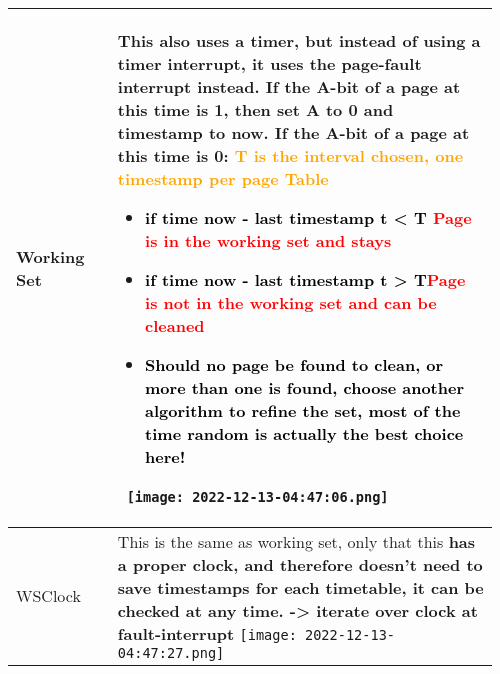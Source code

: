 \documentclass[main.tex,fontsize=8pt,paper=a4,paper=portrait,DIV=calc,]{scrartcl}
\begin{document}
\begin{table}[ht!]
\begin{tabular}{|m{0.2\linewidth}|m{0.755\linewidth}|}
\hline
Working Set & 
This also uses a timer, but \textbf{instead of using a timer interrupt, it uses the page-fault interrupt instead}.\newline
If the A-bit of a page at this time is 1, then set A to 0 and timestamp to now.\newline
If the A-bit of a page at this time is 0:\newline
\textcolor{orange}{T is the interval chosen, one timestamp per page Table}\newline
\begin{itemize}
\item \textcolor{black}{if time now - last timestamp t < T} \textcolor{red}{Page is in the working set and stays}
\item \textcolor{black}{if time now - last timestamp t > T}\textcolor{red}{Page is not in the working set and can be cleaned}
\item \textcolor{black}{Should no page be found to clean, or more than one is found, choose another algorithm to refine the set, \textbf{most of the time random is actually the best choice here!}}
\end{itemize}
\, \newline
\texttt{[image: 2022-12-13-04:47:06.png]}\\
\hline
WSClock & 
This is the same as working set, only that this \textbf{has a proper clock, and therefore doesn't need to save timestamps for each timetable, it can be checked at any time. -> iterate over clock at fault-interrupt}\newline
\texttt{[image: 2022-12-13-04:47:27.png]}\\
\hline
\end{tabular}
\end{table}
\pagebreak
\end{document}

